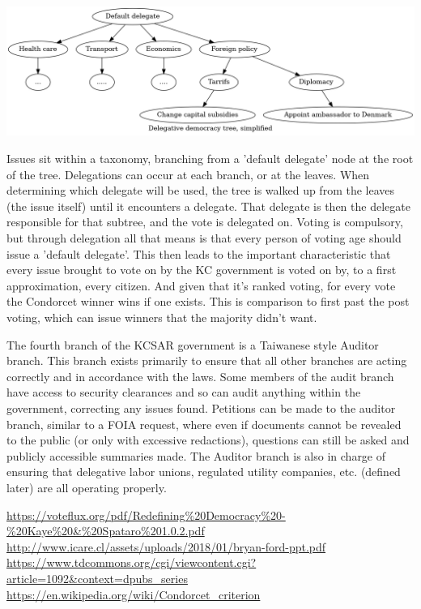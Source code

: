 \documentclass[10pt]{article}
\begin{document}
\includegraphics[width=1\textwidth]{fig_del_democracy_tree.png}

Issues sit within a taxonomy, branching from a 'default delegate' node at the root of the tree. Delegations can occur at each branch, or at the leaves. When determining which delegate will be used, the tree is walked up from the leaves (the issue itself) until it encounters a delegate. That delegate is then the delegate responsible for that subtree, and the vote is delegated on. Voting is compulsory, but through delegation all that means is that every person of voting age should issue a 'default delegate'. This then leads to the important characteristic that every issue brought to vote on by the KC government is voted on by, to a first approximation, every citizen. And given that it's ranked voting, for every vote the Condorcet winner wins if one exists. This is comparison to first past the post voting, which can issue winners that the majority didn't want.

The fourth branch of the KCSAR government is a Taiwanese style Auditor branch. This branch exists primarily to ensure that all other branches are acting correctly and in accordance with the laws. Some members of the audit branch have access to security clearances and so can audit anything within the government, correcting any issues found. Petitions can be made to the auditor branch, similar to a FOIA request, where even if documents cannot be revealed to the public (or only with excessive redactions), questions can still be asked and publicly accessible summaries made. The Auditor branch is also in charge of ensuring that delegative labor unions, regulated utility companies, etc. (defined later) are all operating properly.



\url{https://voteflux.org/pdf/Redefining%20Democracy%20-%20Kaye%20&%20Spataro%201.0.2.pdf}
\url{http://www.icare.cl/assets/uploads/2018/01/bryan-ford-ppt.pdf}
\url{https://www.tdcommons.org/cgi/viewcontent.cgi?article=1092&context=dpubs_series}
\url{https://en.wikipedia.org/wiki/Condorcet_criterion}
\end{document}
